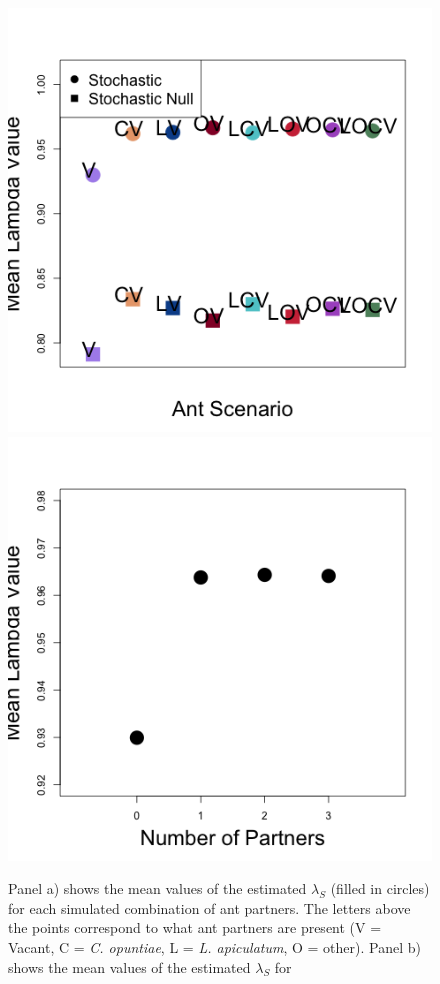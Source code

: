 \documentclass[11pt]{article}
\begin{document}
\begin{figure}
\includegraphics[width=0.61\linewidth]{Figures/equal_outputmeans_s_sn.png}
\includegraphics[width=0.39\linewidth]{Figures/equal_num_partners_s.png}
\caption{Panel a) shows the mean values of the estimated $\lambda_{S}$ (filled in circles) for each simulated combination of ant partners. The letters above the points correspond to what ant partners are present (V = Vacant, C = \textit{C. opuntiae}, L = \textit{L. apiculatum}, O = other). Panel b) shows the mean values of the estimated $\lambda_{S}$ for }
\label{fig:BetweenLambdaMeans}
\end{figure}
\end{document}
